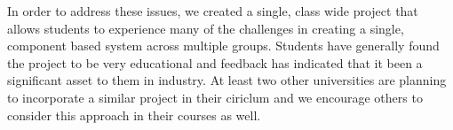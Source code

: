 \documentclass{sig-alternate-05-2015}
\begin{document}
In order to address these issues, we created a single, class wide project that allows students to experience many of the challenges in creating a single, component based system across multiple groups. Students have generally found the project to be very educational and feedback has indicated that it been a significant asset to them in industry. At least two other universities are planning to incorporate a similar project in their ciriclum and we encourage others to consider this approach in their courses as well.



\balance 






\end{document}
